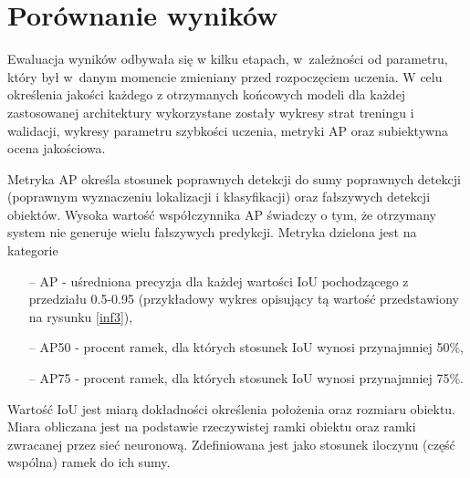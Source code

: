 \section{Porównanie wyników}

\hspace{0.5cm}
Ewaluacja wyników odbywała się w kilku etapach, w~zależności od parametru, który był w~danym momencie zmieniany przed rozpoczęciem uczenia. W celu określenia jakości każdego z otrzymanych końcowych modeli dla każdej zastosowanej architektury wykorzystane zostały wykresy strat treningu i walidacji, wykresy parametru szybkości uczenia, metryki AP oraz subiektywna ocena jakościowa.

\hspace{0.5cm}
Metryka AP określa stosunek poprawnych detekcji do sumy poprawnych detekcji (poprawnym wyznaczeniu lokalizacji i klasyfikacji) oraz fałszywych detekcji obiektów. Wysoka wartość współczynnika AP świadczy o tym, że otrzymany system nie generuje wielu fałszywych predykcji. Metryka dzielona jest na kategorie
\begin{itemize}
    \item[--] AP - uśredniona precyzja dla każdej wartości IoU pochodzącego z przedziału 0.5-0.95 (przykładowy wykres opisujący tą wartość przedstawiony na rysunku \ref{inf3}),
    \item[--] AP50 - procent ramek, dla których stosunek IoU wynosi przynajmniej 50\%,
    \item[--] AP75 - procent ramek, dla których stosunek IoU wynosi przynajmniej 75\%.
\end{itemize}

\hspace{0.5cm}
Wartość IoU jest miarą dokładności określenia położenia oraz rozmiaru obiektu. Miara obliczana jest na podstawie rzeczywistej ramki obiektu oraz ramki zwracanej przez sieć neuronową. Zdefiniowana jest jako stosunek iloczynu (część wspólna) ramek do ich sumy.






